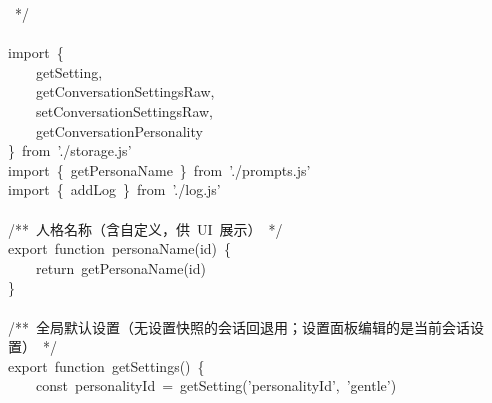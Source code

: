 \documentclass[a4paper,10pt]{article}
\begin{document}
{~*/\\
\mbox{}\\
import~\{\\
~~~~getSetting,\\
~~~~getConversationSettingsRaw,\\
~~~~setConversationSettingsRaw,\\
~~~~getConversationPersonality\\
\}~from~'./storage.js'\\
import~\{~getPersonaName~\}~from~'./prompts.js'\\
import~\{~addLog~\}~from~'./log.js'\\
\mbox{}\\
/**~人格名称（含自定义，供~UI~展示）~*/\\
export~function~personaName(id)~\{\\
~~~~return~getPersonaName(id)\\
\}\\
\mbox{}\\
/**~全局默认设置（无设置快照的会话回退用；设置面板编辑的是当前会话设置）~*/\\
export~function~getSettings()~\{\\
~~~~const~personalityId~=~getSetting('personalityId',~'gentle')
}

\newpage
\end{document}

